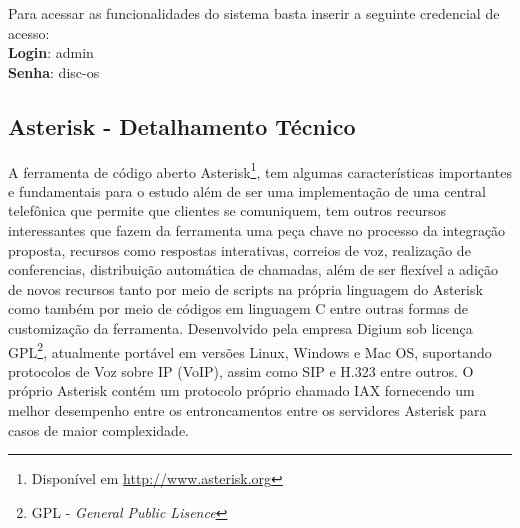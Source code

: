 Para acessar as funcionalidades do sistema basta inserir a seguinte credencial de acesso:\\
\textbf{Login}: admin\\
\textbf{Senha}: disc-os\\


\subsection{Asterisk - Detalhamento Técnico}
A ferramenta de código aberto Asterisk\footnote{Disponível em \url{http://www.asterisk.org}}, tem algumas características importantes e fundamentais para o estudo além de ser uma implementação de uma central telefônica que permite que clientes se comuniquem, tem outros recursos interessantes que fazem da ferramenta uma peça chave no processo da integração proposta, recursos como respostas interativas, correios de voz, realização de conferencias, distribuição automática de chamadas, além de ser flexível a adição de novos recursos tanto por meio de scripts na própria linguagem do Asterisk como também por meio de códigos em linguagem C entre outras formas de customização da ferramenta. Desenvolvido pela empresa Digium sob licença GPL\footnote{GPL - \textit{General Public Lisence}}, atualmente portável em versões Linux, Windows e Mac OS, suportando protocolos de Voz sobre IP (VoIP), assim como SIP e H.323 entre outros. O próprio Asterisk contém um protocolo próprio chamado IAX fornecendo um melhor desempenho entre os entroncamentos entre os servidores Asterisk para casos de maior complexidade.
